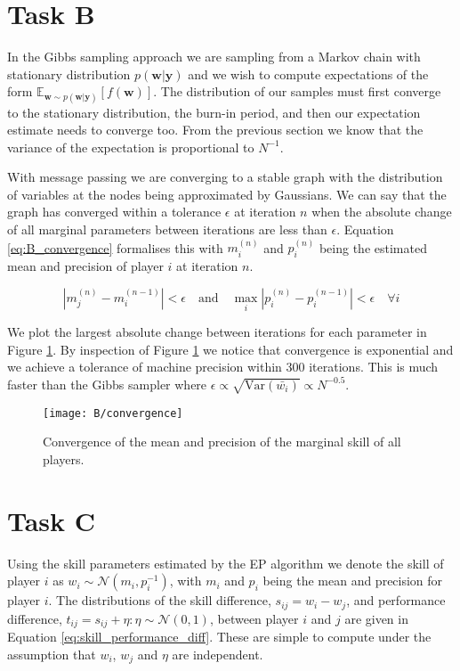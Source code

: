 \documentclass[11pt]{article}
\begin{document}
\section{Task B}

In the Gibbs sampling approach we are sampling from a Markov chain with stationary distribution $p(\mathbf{w}|\mathbf{y})$ and we wish to compute expectations of the form $\mathbb{E}_{\mathbf{w} \sim p(\mathbf{w}|\mathbf{y})}[f(\mathbf{w})]$. The distribution of our samples must first converge to the stationary distribution, the burn-in period, and then our expectation estimate needs to converge too. From the previous section we know that the variance of the expectation is proportional to $N^{-1}$.

With message passing we are converging to a stable graph with the distribution of variables at the nodes being approximated by Gaussians. We can say that the graph has converged within a tolerance $\epsilon$ at iteration $n$ when the absolute change of all marginal parameters between iterations are less than $\epsilon$. Equation \ref{eq:B_convergence} formalises this with $m_i^{(n)}$ and $p_i^{(n)}$ being the estimated mean and precision of player $i$ at iteration $n$.

\begin{equation}
    |m_j^{(n)} - m_i^{(n-1)}| < \epsilon \quad \text{and} \quad \max_{i} |p_i^{(n)} - p_i^{(n-1)}| < \epsilon \quad \forall i
    \label{eq:B_convergence}
\end{equation}

We plot the largest absolute change between iterations for each parameter in Figure \ref{fig:B_convergence}. By inspection of Figure \ref{fig:B_convergence} we notice that convergence is exponential and we achieve a tolerance of machine precision within 300 iterations. This is much faster than the Gibbs sampler where $\epsilon \propto \sqrt{\text{Var}(\bar{w_i})} \propto N^{-0.5}$.

\begin{figure}[h]
    \centering
    \texttt{[image: B/convergence]} 
    \caption{Convergence of the mean and precision of the marginal skill of all players.}
    \label{fig:B_convergence}
\end{figure}

\section{Task C}

Using the skill parameters estimated by the EP algorithm we denote the skill of player $i$ as $w_i \sim \mathcal{N}(m_i, p_i^{-1})$, with $m_i$ and $p_i$ being the mean and precision for player $i$. The distributions of the skill difference, $s_{ij} = w_i - w_j$, and performance difference, $t_{ij} = s_{ij} + \eta : \eta \sim \mathcal{N}(0, 1)$, between player $i$ and $j$ are given in Equation \ref{eq:skill_performance_diff}. These are simple to compute under the assumption that $w_i$, $w_j$ and $\eta$ are independent.
\end{document}
